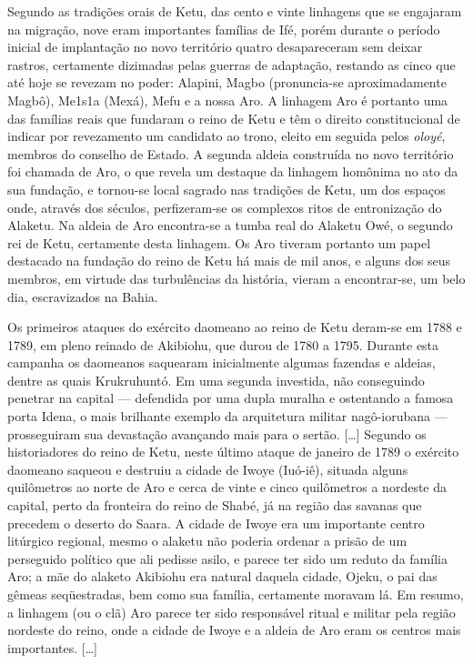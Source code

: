\begin{citacao}
Segundo as tradições orais de Ketu, das cento e vinte linhagens que se engajaram na migração, nove eram importantes famílias de Ifé, porém durante o período inicial de implantação no novo território quatro desapareceram sem deixar rastros, certamente dizimadas pelas guerras de adaptação, restando as cinco que até hoje se revezam no poder: Alapini, Magbo (pronuncia-se aproximadamente Magbô), Me1s1a (Mexá), Mefu e a nossa Aro. A linhagem Aro é portanto uma das famílias reais que fundaram o reino de Ketu e têm o direito constitucional de indicar por revezamento um candidato ao trono, eleito em seguida pelos \textit{oloyé}, membros do conselho de Estado. A segunda aldeia construída no novo território foi chamada de Aro, o que revela um destaque da linhagem homônima no ato da sua fundação, e tornou-se local sagrado nas tradições de Ketu, um dos espaços onde, através dos séculos, perfizeram-se os complexos ritos de entronização do Alaketu. Na aldeia de Aro encontra-se a tumba real do Alaketu Owé, o segundo rei de Ketu, certamente desta linhagem. Os Aro tiveram portanto um papel destacado na fundação do reino de Ketu há mais de mil anos, e alguns dos seus membros, em virtude das turbulências da história, vieram a encontrar-se, um belo dia, escravizados na Bahia. 

Os primeiros ataques do exército daomeano ao reino de Ketu deram-se em 1788 e 1789, em pleno reinado de Akibiohu, que durou de 1780 a 1795. Durante esta campanha os daomeanos saquearam inicialmente algumas fazendas e aldeias, dentre as quais Krukruhuntó. Em uma segunda investida, não conseguindo penetrar na capital — defendida por uma dupla muralha e ostentando a famosa porta Idena, o mais brilhante exemplo da arquitetura militar nagô-iorubana — prosseguiram sua devastação avançando mais para o sertão. [\dots] Segundo os historiadores do reino de Ketu, neste último ataque de janeiro de 1789 o exército daomeano saqueou e destruiu a cidade de Iwoye (Iuó-iê), situada alguns quilômetros ao norte de Aro e cerca de vinte e cinco quilômetros a nordeste da capital, perto da fronteira do reino de Shabé, já na região das savanas que precedem o deserto do Saara. A cidade de Iwoye era um importante centro litúrgico regional, mesmo o alaketu não poderia ordenar a prisão de um perseguido político que ali pedisse asilo, e parece ter sido um reduto da família Aro; a mãe do alaketo Akibiohu era natural daquela cidade, Ojeku, o pai das gêmeas seqüestradas, bem como sua família, certamente moravam lá. Em resumo, a linhagem (ou o clã) Aro parece ter sido responsável ritual e militar pela região nordeste do reino, onde a cidade de Iwoye e a aldeia de Aro eram os centros mais importantes. [\dots]


\end{citacao}
